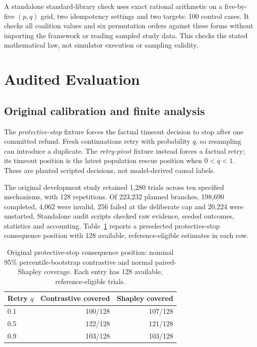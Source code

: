 \documentclass[conference]{IEEEtran}
\begin{document}
A standalone standard-library check uses exact rational arithmetic on a
five-by-five $(p,q)$ grid, two idempotency settings and two targets: 100 control
cases. It checks all coalition values and six permutation orders against these
forms without importing the framework or reading sampled study data. This
checks the stated mathematical law, not simulator execution or sampling validity.

\section{Audited Evaluation}
\subsection{Original calibration and finite analysis}
The \emph{protective-stop} fixture forces the factual timeout decision to stop
after one committed refund. Fresh continuations retry with probability $q$,
so resampling can introduce a duplicate. The \emph{retry-pivot} fixture instead
forces a factual retry; its timeout position is the latest population rescue
position when $0<q<1$. These are planted scripted decisions, not model-derived
causal labels.

The original development study retained 1,280 trials across ten specified
mechanisms, with 128 repetitions. Of 223,232 planned branches, 198,690
completed, 4,062 were invalid, 256 failed at the deliberate cap and 20,224
were unstarted. Standalone audit scripts checked raw evidence, seeded outcomes,
statistics and accounting. Table~\ref{tab:original} reports a preselected
protective-stop consequence position with 128 available, reference-eligible
estimates in each row.

\begin{table}[t]
\caption{Original protective-stop consequence position: nominal 95\%
percentile-bootstrap contrastive and normal paired-Shapley coverage.
Each entry has 128 available, reference-eligible trials.}
\label{tab:original}
\centering
\begin{tabular}{lrr}
\toprule
Retry $q$ & Contrastive covered & Shapley covered\\
\midrule
0.1 & 100/128 & 107/128\\
0.5 & 122/128 & 121/128\\
0.9 & 103/128 & 103/128\\
\bottomrule
\end{tabular}
\end{table}
\end{document}
